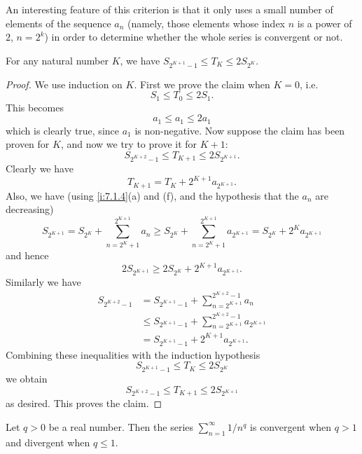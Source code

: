 \begin{rmk}\label{i:7.3.5}
  An interesting feature of this criterion is that it only uses a small number of elements of the sequence \(a_n\)
  (namely, those elements whose index \(n\) is a power of \(2\), \(n = 2^k\))
  in order to determine whether the whole series is convergent or not.
\end{rmk}

\begin{lem}\label{i:7.3.6}
  For any natural number \(K\), we have \(S_{2^{K + 1} - 1} \leq T_K \leq 2S_{2^K}\).
\end{lem}

\begin{proof}
  We use induction on \(K\).
  First we prove the claim when \(K = 0\), i.e.
  \[
    S_1 \leq T_0 \leq 2S_1.
  \]
  This becomes
  \[
    a_1 \leq a_1 \leq 2a_1
  \]
  which is clearly true, since \(a_1\) is non-negative.
  Now suppose the claim has been proven for \(K\), and now we try to prove it for \(K + 1\):
  \[
    S_{2^{K + 2} - 1} \leq T_{K + 1} \leq 2S_{2^{K + 1}}.
  \]
  Clearly we have
  \[
    T_{K + 1} = T_K + 2^{K + 1} a_{2^{K + 1}}.
  \]
  Also, we have
  (using \cref{i:7.1.4}(a) and (f), and the hypothesis that the \(a_n\) are decreasing)
  \[
    S_{2^{K + 1}} = S_{2^K} + \sum_{n = 2^K + 1}^{2^{K + 1}} a_n \geq S_{2^K} + \sum_{n = 2^K + 1}^{2^{K + 1}} a_{2^{K + 1}} = S_{2^K} + 2^K a_{2^{K + 1}}
  \]
  and hence
  \[
    2S_{2^{K + 1}} \geq 2S_{2^K} + 2^{K + 1} a_{2^{K + 1}}.
  \]
  Similarly we have
  \begin{align*}
    S_{2^{K + 2} - 1} & = S_{2^{K + 1} - 1} + \sum_{n = 2^{K + 1}}^{2^{K + 2} - 1} a_n              \\
                      & \leq S_{2^{K + 1} - 1} + \sum_{n = 2^{K + 1}}^{2^{K + 2} - 1} a_{2^{K + 1}} \\
                      & = S_{2^{K + 1} - 1} + 2^{K + 1} a_{2^{K + 1}}.
  \end{align*}
  Combining these inequalities with the induction hypothesis
  \[
    S_{2^{K + 1} - 1} \leq T_K \leq 2S_{2^K}
  \]
  we obtain
  \[
    S_{2^{K + 2} - 1} \leq T_{K + 1} \leq 2S_{2^{K + 1}}
  \]
  as desired.
  This proves the claim.
\end{proof}

\begin{cor}\label{i:7.3.7}
  Let \(q > 0\) be a real number.
  Then the series \(\sum_{n = 1}^\infty 1 / n^q\) is convergent when \(q > 1\) and divergent when \(q \leq 1\).
\end{cor}


